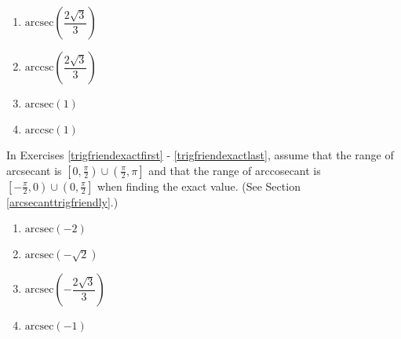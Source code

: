 \begin{multicols}{4}

\begin{enumerate}

\setcounter{enumi}{\value{HW}}

\item $\mbox{arcsec} \left( \dfrac{2\sqrt{3}}{3} \right)$
\item $\mbox{arccsc} \left( \dfrac{2\sqrt{3}}{3} \right)$
\item $\mbox{arcsec} \left( 1 \right)$ 
\item $\mbox{arccsc} \left( 1 \right)$  \label{exactvaluearclast}

\setcounter{HW}{\value{enumi}}

\end{enumerate}

\end{multicols}

In Exercises \ref{trigfriendexactfirst} - \ref{trigfriendexactlast}, assume that the range of arcsecant is $\left[0, \frac{\pi}{2} \right) \cup \left( \frac{\pi}{2}, \pi \right]$ and that the range of arccosecant is
$\left[ -\frac{\pi}{2}, 0 \right)  \cup \left(0, \frac{\pi}{2} \right]$ when finding the exact value. (See Section \ref{arcsecanttrigfriendly}.)

\begin{multicols}{4} 

\begin{enumerate}

\setcounter{enumi}{\value{HW}}

\item $\mbox{arcsec} \left( -2 \right)$  \label{trigfriendexactfirst}
\item $\mbox{arcsec} \left( -\sqrt{2} \right)$  
\item $\mbox{arcsec} \left( -\dfrac{2\sqrt{3}}{3} \right)$
\item $\mbox{arcsec} \left( -1 \right)$  

\setcounter{HW}{\value{enumi}}

\end{enumerate}

\end{multicols}

